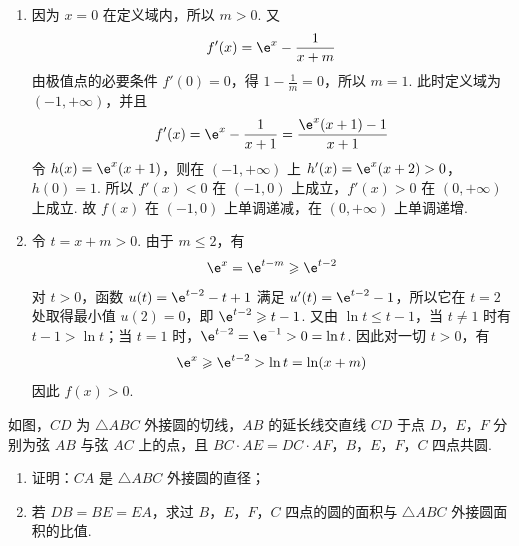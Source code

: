 \begin{solution}
\begin{enumerate}
\item 因为 \(x=0\) 在定义域内，所以 \(m>0\). 又
\[
f'(x)=\e^x-\frac1{x+m}
\]
由极值点的必要条件 \(f'(0)=0\)，得 \(1-\frac{1}{m}=0\)，所以 \(m=1\). 此时定义域为 \((-1,+\infty)\)，并且
\[
f'(x)=\e^x-\frac1{x+1}=\frac{\e^x(x+1)-1}{x+1}
\]
令 \(h(x)=\e^x(x+1)\)，则在 \((-1,+\infty)\) 上
\(h'(x)=\e^x(x+2)>0\)，\(h(0)=1\).
所以 \(f'(x)<0\) 在 \((-1,0)\) 上成立，\(f'(x)>0\) 在 \((0,+\infty)\) 上成立. 故 \(f(x)\) 在 \((-1,0)\) 上单调递减，在 \((0,+\infty)\) 上单调递增.

\item 令 \(t=x+m>0\). 由于 \(m\leqslant2\)，有
\[
\e^x=\e^{t-m}\geqslant\e^{t-2}
\]
对 \(t>0\)，函数 \(u(t)=\e^{t-2}-t+1\) 满足 \(u'(t)=\e^{t-2}-1\)，所以它在 \(t=2\) 处取得最小值 \(u(2)=0\)，即 \(\e^{t-2}\geqslant t-1\). 又由 \(\ln t\leqslant t-1\)，当 \(t\ne1\) 时有 \(t-1>\ln t\)；当 \(t=1\) 时，\(\e^{t-2}=\e^{-1}>0=\ln t\). 因此对一切 \(t>0\)，有
\[
\e^x\geqslant\e^{t-2}>\ln t=\ln(x+m)
\]
因此 \(f(x)>0\).
\end{enumerate}
\end{solution}

\begin{problem}
如图，\(CD\) 为 \(\triangle ABC\) 外接圆的切线，\(AB\) 的延长线交直线 \(CD\) 于点 \(D\)，\(E\)，\(F\) 分别为弦 \(AB\) 与弦 \(AC\) 上的点，且 \(BC \cdot AE = DC \cdot AF\)，\(B\)，\(E\)，\(F\)，\(C\) 四点共圆.

\begin{enumerate}
\item 证明：\(CA\) 是 \(\triangle ABC\) 外接圆的直径；
\item 若 \(DB = BE = EA\)，求过 \(B\)，\(E\)，\(F\)，\(C\) 四点的圆的面积与 \(\triangle ABC\) 外接圆面积的比值.
\end{enumerate}

\end{problem}

